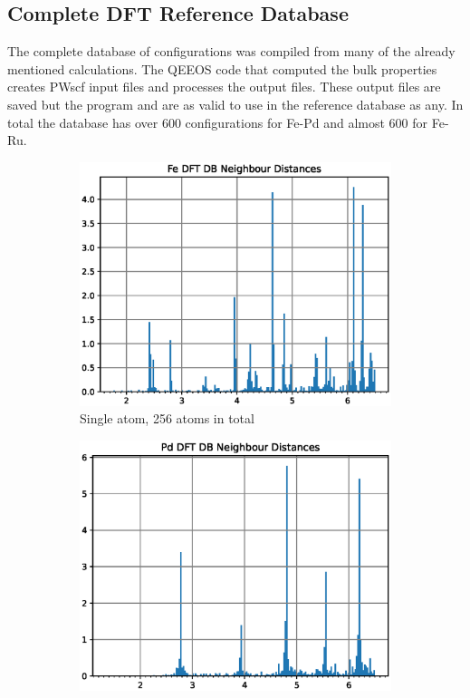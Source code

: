 \subsection{Complete DFT Reference Database}

The complete database of configurations was compiled from many of the already mentioned calculations.  The QEEOS code that computed the bulk properties creates PWscf input files and processes the output files.  These output files are saved but the program and are as valid to use in the reference database as any.  In total the database has over 600 configurations for Fe-Pd and almost 600 for Fe-Ru.  

\begin{figure}
\begin{subfigure}{.32\textwidth}
  \centering
  \includegraphics[width=.94\linewidth]{chapters/potentials_fe_pd_ru/neighbour_distances/db_fe_neighbours.eps}  
  \caption{Single atom, 256 atoms in total}
  \label{fig:sub-first}
\end{subfigure}
\begin{subfigure}{.32\textwidth}
  \centering
  \includegraphics[width=.94\linewidth]{chapters/potentials_fe_pd_ru/neighbour_distances/db_pd_neighbours.eps}  

\end{subfigure}
\end{figure}
